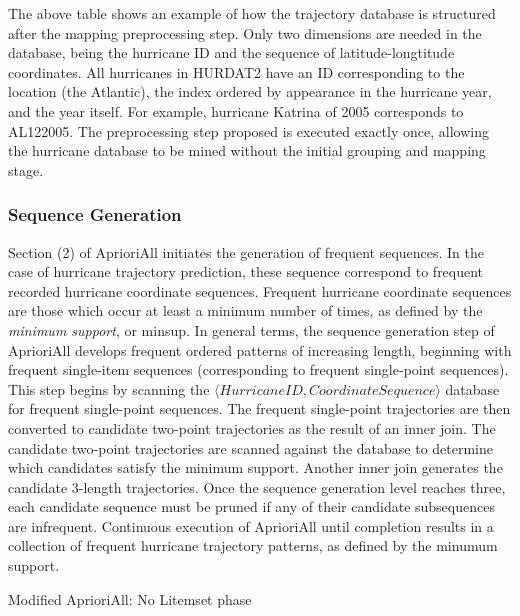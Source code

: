 \documentclass[12pt,conference]{IEEEtran}
\begin{document}
The above table shows an example of how the trajectory database is structured after the mapping preprocessing step. Only two dimensions are needed in the database, being the hurricane ID and the sequence of latitude-longtitude coordinates. All hurricanes in HURDAT2 have an ID corresponding to the location (the Atlantic), the index ordered by appearance in the hurricane year, and the year itself. For example, hurricane Katrina of 2005 corresponds to AL122005. The preprocessing step proposed is executed exactly once, allowing the hurricane database to be mined without the initial grouping and mapping stage.

\subsubsection{Sequence Generation}

Section (2) of AprioriAll initiates the generation of frequent sequences. In the case of hurricane trajectory prediction, these sequence correspond to frequent recorded hurricane coordinate sequences. Frequent hurricane coordinate sequences are those which occur at least a minimum number of times, as defined by the \textit{minimum support}, or minsup. In general terms, the sequence generation step of AprioriAll develops frequent ordered patterns of increasing length, beginning with frequent single-item sequences (corresponding to frequent single-point sequences). This step begins by scanning the $\langle HurricaneID, CoordinateSequence\rangle$ database for frequent single-point sequences. The frequent single-point trajectories are then converted to candidate two-point trajectories as the result of an inner join. The candidate two-point trajectories are scanned against the database to determine which candidates satisfy the minimum support. Another inner join generates the candidate 3-length trajectories. Once the sequence generation level reaches three, each candidate sequence must be pruned if any of their candidate subsequences are infrequent. Continuous execution of AprioriAll until completion results in a collection of frequent hurricane trajectory patterns, as defined by the minumum support.

\begin{algorithm}[H]
  \caption{Modified AprioriAll: No Litemset phase}
  \label{aprioriall_for_hurricanes}
  \begin{algorithmic}[1]
    \EndFor
  \EndFor
  \end{algorithmic}
\end{algorithm}
\end{document}
